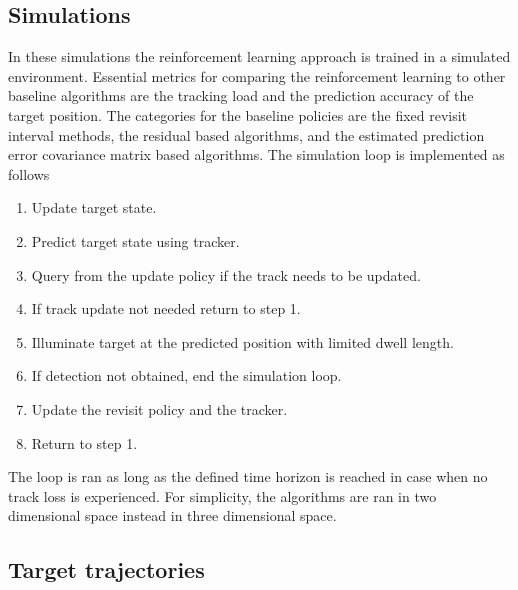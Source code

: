 \documentclass[english, 12pt, a4paper, elec, utf8, a-1b, online]{aaltothesis}
\begin{document}
\subsection{Simulations}\label{seq:ri_sim}


In these simulations the reinforcement learning approach is trained in a simulated environment.
Essential metrics for comparing the reinforcement learning to other baseline algorithms are the tracking load and the prediction accuracy of the target position.
The categories for the baseline policies are the fixed revisit interval methods, the residual based algorithms, and the estimated prediction error covariance matrix based algorithms.
The simulation loop is implemented as follows
\begin{enumerate}
    \item Update target state.
    \item Predict target state using tracker.
    \item Query from the update policy if the track needs to be updated.
    \item If track update not needed return to step 1.
    \item Illuminate target at the predicted position with limited dwell length.
    \item If detection not obtained, end the simulation loop.
    \item Update the revisit policy and the tracker.
    \item Return to step 1.
\end{enumerate}
The loop is ran as long as the defined time horizon is reached in case when no track loss is experienced.
For simplicity, the algorithms are ran in two dimensional space instead in three dimensional space.

\subsection{Target trajectories}
\end{document}
